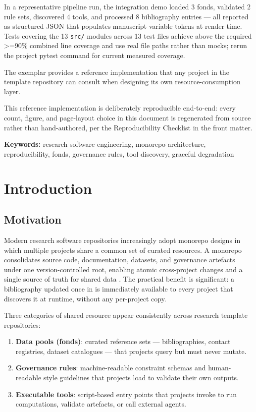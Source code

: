 \documentclass[
]{article}
\providecommand{\tightlist}{%
  \setlength{\itemsep}{0pt}\setlength{\parskip}{0pt}}
\begin{document}
In a representative pipeline run, the integration demo loaded 3 fonds,
validated 2 rule sets, discovered 4 tools, and processed 8 bibliography
entries --- all reported as structured JSON that populates manuscript
variable tokens at render time. Tests covering the 13 \texttt{src/}
modules across 13 test files achieve above the required \texorpdfstring{\textgreater{}=}{>=}90\% combined
line coverage and use real file paths rather than mocks; rerun the
project pytest command for current measured coverage.

The  exemplar provides a reference
implementation that any project in the template repository can consult
when designing its own resource-consumption layer.

This reference implementation is deliberately reproducible end-to-end:
every count, figure, and page-layout choice in this document is
regenerated from source rather than hand-authored, per the
Reproducibility Checklist in the front matter.

\textbf{Keywords:} research software engineering, monorepo architecture,
reproducibility, fonds, governance rules, tool discovery, graceful
degradation

\newpage

\section{Introduction}\label{introduction}

\subsection{Motivation}\label{motivation}

Modern research software repositories increasingly adopt monorepo
designs in which multiple projects share a common set of curated
resources. A monorepo consolidates source code, documentation, datasets,
and governance artefacts under one version-controlled root, enabling
atomic cross-project changes and a single source of truth for shared
data \citep{Fowler2002patterns}. The practical benefit is significant: a
bibliography updated once in
 is immediately
available to every project that discovers it at runtime, without any
per-project copy.

Three categories of shared resource appear consistently across research
template repositories:

\begin{enumerate}
\def\labelenumi{\arabic{enumi}.}
\tightlist
\item
  \textbf{Data pools (fonds)}: curated reference sets ---
  bibliographies, contact registries, dataset catalogues --- that
  projects query but must never mutate.
\item
  \textbf{Governance rules}: machine-readable constraint schemas and
  human-readable style guidelines that projects load to validate their
  own outputs.
\item
  \textbf{Executable tools}: script-based entry points that projects
  invoke to run computations, validate artefacts, or call external
  agents.
\end{enumerate}
\end{document}
